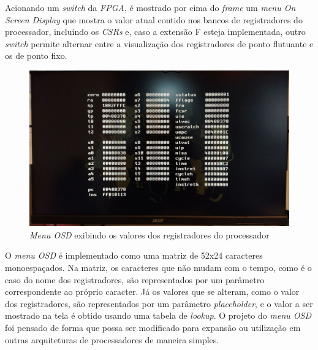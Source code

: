     { Acionando um \textit{switch} da \textit{FPGA}, é mostrado por cima do
        \textit{frame} um \textit{menu On Screen Display} que mostra o valor
        atual contido nos bancos de registradores do processador, incluindo os
        \textit{CSRs} e, caso a extensão F esteja implementada, outro
        \textit{switch} permite alternar entre a visualização dos registradores
        de ponto flutuante e os de ponto fixo.
    }
    \begin{figure}[H]
    \centering
        \includegraphics[width=.9\linewidth]{../images/osd/display_osd.jpg}
        \caption{\textit{Menu OSD} exibindo os valores dos registradores do processador}
        \label{fig:display_cats_osd}
    \end{figure}

    { O \textit{menu OSD} é implementado como uma matriz de 52x24 caracteres
        monoespaçados. Na matriz, os caracteres que não mudam com o tempo, como
        é o caso do nome dos registradores, são representados por um parâmetro
        correspondente ao próprio caracter. Já os valores que se alteram, como
        o valor dos registradores, são representados por um parâmetro
        \textit{placeholder}, e o valor a ser mostrado na tela é obtido usando
        uma tabela de \textit{lookup}. O projeto do \textit{menu OSD} foi pensado
        de forma que possa ser modificado para expansão ou utilização em outras
        arquiteturas de processadores de maneira simples.
    }

\clearpage
